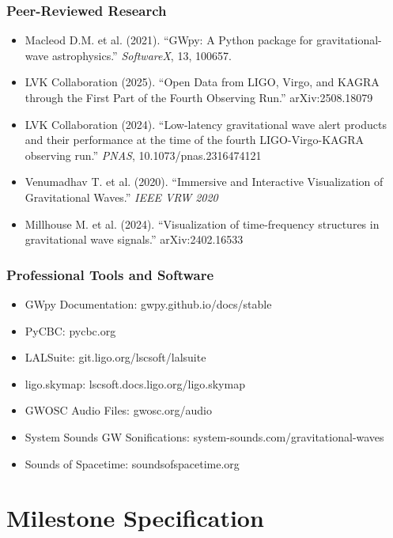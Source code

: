 \documentclass[11pt,letterpaper]{article}
\newcommand{\stageheader}[2]{%
  \noindent\colorbox{#2}{\makebox[\textwidth][l]{%
    \textcolor{white}{\bfseries\sffamily\hspace{6pt}#1\hspace{6pt}}}}%
  \vspace{0.5em}\par%
}
\begin{document}
\subsubsection{Peer-Reviewed Research}
\begin{itemize}[noitemsep]
  \item Macleod D.M. et al. (2021). ``GWpy: A Python package for gravitational-wave astrophysics.'' \emph{SoftwareX}, 13, 100657.
  \item LVK Collaboration (2025). ``Open Data from LIGO, Virgo, and KAGRA through the First Part of the Fourth Observing Run.'' arXiv:2508.18079
  \item LVK Collaboration (2024). ``Low-latency gravitational wave alert products and their performance at the time of the fourth LIGO-Virgo-KAGRA observing run.'' \emph{PNAS}, 10.1073/pnas.2316474121
  \item Venumadhav T. et al. (2020). ``Immersive and Interactive Visualization of Gravitational Waves.'' \emph{IEEE VRW 2020}
  \item Millhouse M. et al. (2024). ``Visualization of time-frequency structures in gravitational wave signals.'' arXiv:2402.16533
\end{itemize}

\subsubsection{Professional Tools and Software}
\begin{itemize}[noitemsep]
  \item GWpy Documentation: gwpy.github.io/docs/stable
  \item PyCBC: pycbc.org
  \item LALSuite: git.ligo.org/lscsoft/lalsuite
  \item ligo.skymap: lscsoft.docs.ligo.org/ligo.skymap
  \item GWOSC Audio Files: gwosc.org/audio
  \item System Sounds GW Sonifications: system-sounds.com/gravitational-waves
  \item Sounds of Spacetime: soundsofspacetime.org
\end{itemize}

\newpage
\stageheader{STAGE 3 --- MISSION PACKAGE}{accent}

\section{Milestone Specification}
\end{document}
